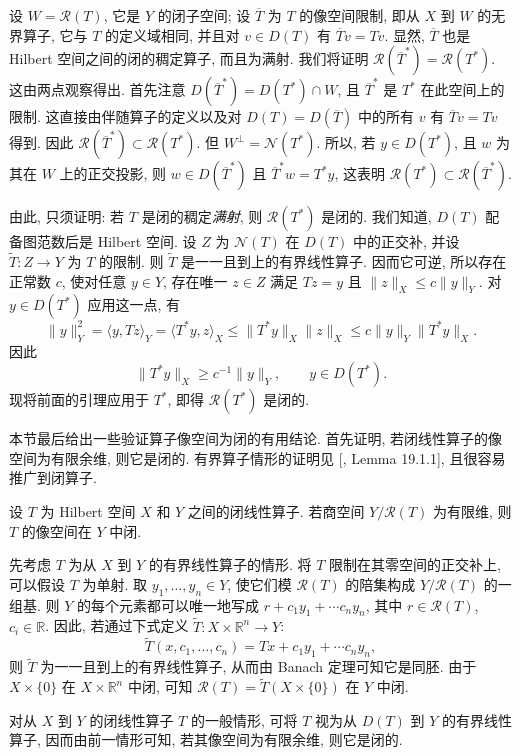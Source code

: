 \begin{Proof}
设 $W=\mathcal R(T)$, 它是 $Y$ 的闭子空间; 设 $\overline T$ 为 $T$ 的像空间限制, 即从 $X$ 到 $W$ 的无界算子, 它与 $T$ 的定义域相同, 并且对 $v\in D(T)$ 有 $\overline Tv=Tv$. 显然, $\overline T$ 也是 Hilbert 空间之间的闭的稠定算子, 而且为满射. 我们将证明 $\mathcal R(\overline T^*)=\mathcal R(T^*)$. 这由两点观察得出. 首先注意 $D(\overline T^*)=D(T^*)\cap W$, 且 $\overline T^*$ 是 $T^*$ 在此空间上的限制. 这直接由伴随算子的定义以及对 $D(T)=D(\overline T)$ 中的所有 $v$ 有 $\overline Tv=Tv$ 得到. 因此 $\mathcal R(\overline T^*)\subset\mathcal R(T^*)$. 但 $W^\perp=\mathcal N(T^*)$. 所以, 若 $y\in D(T^*)$, 且 $w$ 为其在 $W$ 上的正交投影, 则 $w\in D(\overline T^*)$ 且 $\overline T^*w=T^*y$, 这表明 $\mathcal R(T^*)\subset\mathcal R(\overline T^*)$.

由此, 只须证明: 若 $T$ 是闭的稠定\emph{满射}, 则 $\mathcal R(T^*)$ 是闭的. 我们知道, $D(T)$ 配备图范数后是 Hilbert 空间. 设 $Z$ 为 $\mathcal N(T)$ 在 $D(T)$ 中的正交补, 并设 $\widetilde T:Z\to Y$ 为 $T$ 的限制. 则 $\widetilde T$ 是一一且到上的有界线性算子. 因而它可逆, 所以存在正常数 $c$, 使对任意 $y\in Y$, 存在唯一 $z\in Z$ 满足 $Tz=y$ 且 $\|z\|_X\leq c\|y\|_Y$. 对 $y\in D(T^*)$ 应用这一点, 有
\[
\|y\|_Y^2=\langle y,Tz\rangle_Y=\langle T^*y,z\rangle_X\leq\|T^*y\|_X\|z\|_X\leq c\|y\|_Y\|T^*y\|_X.
\]
因此
\[
\|T^*y\|_X\geq c^{-1}\|y\|_Y,\qquad y\in D(T^*).
\]
现将前面的引理应用于 $T^*$, 即得 $\mathcal R(T^*)$ 是闭的.
\end{Proof}

本节最后给出一些验证算子像空间为闭的有用结论. 首先证明, 若闭线性算子的像空间为有限余维, 则它是闭的. 有界算子情形的证明见 [, Lemma 19.1.1], 且很容易推广到闭算子.

\begin{Theorem}\label{thm:finite-codimension-closed-range}
设 $T$ 为 Hilbert 空间 $X$ 和 $Y$ 之间的闭线性算子. 若商空间 $Y/\mathcal R(T)$ 为有限维, 则 $T$ 的像空间在 $Y$ 中闭.
\end{Theorem}

\begin{Proof}
先考虑 $T$ 为从 $X$ 到 $Y$ 的有界线性算子的情形. 将 $T$ 限制在其零空间的正交补上, 可以假设 $T$ 为单射. 取 $y_1,\ldots,y_n\in Y$, 使它们模 $\mathcal R(T)$ 的陪集构成 $Y/\mathcal R(T)$ 的一组基. 则 $Y$ 的每个元素都可以唯一地写成 $r+c_1y_1+\cdots c_ny_n$, 其中 $r\in\mathcal R(T)$, $c_i\in\mathbb R$. 因此, 若通过下式定义 $\widetilde T:X\times\mathbb R^n\to Y$:
\[
\widetilde T(x,c_1,\ldots,c_n)=Tx+c_1y_1+\cdots c_ny_n,
\]
则 $\widetilde T$ 为一一且到上的有界线性算子, 从而由 Banach 定理可知它是同胚. 由于 $X\times\{0\}$ 在 $X\times\mathbb R^n$ 中闭, 可知 $\mathcal R(T)=\widetilde T(X\times\{0\})$ 在 $Y$ 中闭.

对从 $X$ 到 $Y$ 的闭线性算子 $T$ 的一般情形, 可将 $T$ 视为从 $D(T)$ 到 $Y$ 的有界线性算子, 因而由前一情形可知, 若其像空间为有限余维, 则它是闭的.
\end{Proof}

